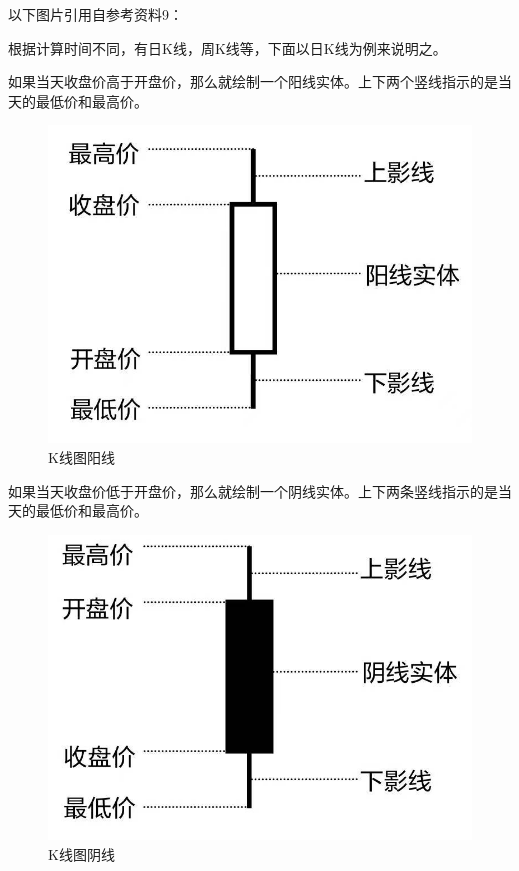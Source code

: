 \documentclass[12pt,oneside]{book}
\begin{document}
以下图片引用自参考资料9：

根据计算时间不同，有日K线，周K线等，下面以日K线为例来说明之。

如果当天收盘价高于开盘价，那么就绘制一个阳线实体。上下两个竖线指示的是当天的最低价和最高价。

\begin{figure}[H]
\centering
\includegraphics[width=\linewidth ,totalheight=0.95\textheight , keepaspectratio]{K线图阳线.jpg}
\caption{K线图阳线}
\end{figure}

如果当天收盘价低于开盘价，那么就绘制一个阴线实体。上下两条竖线指示的是当天的最低价和最高价。

\begin{figure}[H]
\centering
\includegraphics[width=\linewidth ,totalheight=0.95\textheight , keepaspectratio]{K线图阴线.jpg}
\caption{K线图阴线}
\end{figure}
\end{document}
